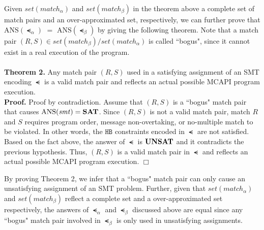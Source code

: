 Given $\mathit{set(match_{\alpha})}$ and $\mathit{set(match_{\beta})}$ in the theorem above a complete set of match pairs and an over-approximated set, respectively, we can further prove that $\mathrm{ANS}(\smt_{\alpha})$ $ = $ $\mathrm{ANS}(\smt_{\beta})$ by giving the following theorem. Note that a match pair $(R, S) \in \mathit{set(match_{\beta})}/\mathit{set(match_{\alpha})}$ is called ``bogus", since it cannot exist in a real execution of the program.
\\
\\
\textbf{Theorem 2.}
Any match pair $(R, S)$ used in a satisfying assignment of an SMT encoding $\smt$ is a valid match pair and reflects an actual possible MCAPI program execution.
\\
\textbf{Proof.}
Proof by contradiction. Assume that $(R, S)$ is a ``bogus" match pair that causes $\mathrm{ANS}(\mathit{smt}) = \textbf{SAT}$. Since $(R, S)$ is not a valid match pair, match $R$ and $S$ requires program order, message non-overtaking, or no-multiple match to be violated. In other words, the $\mathtt{HB}$ constraints encoded in $\smt$ are not satisfied. Based on the fact above, the answer of $\smt$ is $\textbf{UNSAT}$ and it contradicts the previous hypothesis. Thus, $(R, S)$ is a valid match pair in $\smt$ and reflects an actual possible MCAPI program execution. $\Box$


By proving Theorem 2, we infer that a ``bogus" match pair can only cause an unsatisfying assignment of an SMT problem. Further, given that $\mathit{set(match_{\alpha})}$ and $\mathit{set(match_{\beta})}$ reflect a complete set and a over-approximated set respectively, the answers of $\smt_{\alpha}$ and $\smt_{\beta}$ discussed above are equal since any ``bogus" match pair involved in $\smt_{\beta}$ is only used in unsatisfying assignments.












